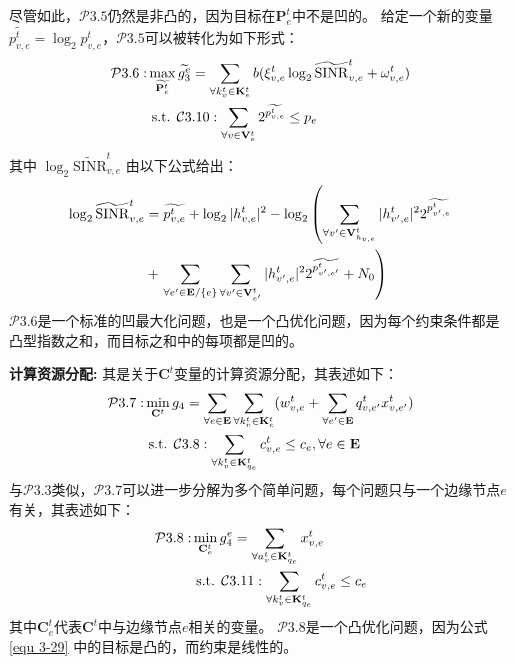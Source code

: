 尽管如此，$\mathcal{P}3.5$仍然是非凸的，因为目标在$\mathbf{P}_{e}^{t}$中不是凹的。
给定一个新的变量$\widetilde{p_{v, e}^t} = \log _{2} {p}_{v, e}^t$，$\mathcal{P}3.5$可以被转化为如下形式：
\begin{align}
	\mathcal{P}3.6: & \max_{\widetilde{\mathbf{{P}}_{e}^{t}}}  \widetilde{g_3^{e}}= \sum_{\forall k_{v}^{t} \in \mathbf{K}_{e}^{t}} {b ( \xi_{v, e}^{t} \log _{2}\mathrm{\widetilde{SINR}}_{v, e}^t + \omega_{v, e}^{t} ) } \notag \\
	&\text { s.t. } \mathcal{C}3.10: \sum_{\forall v \in \mathbf{V}_{e}^{t}} 2^{\widetilde{p_{v, e}^t}} \leq p_{e}  
\end{align}
其中 $\log _{2}\mathrm{\widetilde{SINR}}_{v, e}^t$ 由以下公式给出：
\begin{align}
	\log _{2}\mathrm{\widetilde{SINR}}_{v, e}^t &= \widetilde{p_{v, e}^t} + \log _{2} |h_{v, e}^t| ^{2} - \log _{2} \left( \sum\limits_{\forall v^{\prime} \in \mathbf{V}_{h_{v, e}}^{t}} |h_{v^{\prime}, e}^t|^2 2^{\widetilde{p_{v^{\prime}, e}^{t}}} \right. \notag \\
	&+ \left. \sum\limits_{\forall e^{\prime} \in \mathbf{E} / \{e\}} \sum\limits_{\forall v^{\prime} \in \mathbf{V}_{e^{\prime}}^{t}} |h_{v^{\prime}, e}^t|^2 2^{\widetilde{p_{v^{\prime}, e^{\prime}}^{t}}} + N_{0}\right)
\end{align}
\noindent $\mathcal{P}3.6$是一个标准的凹最大化问题，也是一个凸优化问题，因为每个约束条件都是凸型指数之和，而目标之和中的每项都是凹的。

\textbf{计算资源分配:} 其是关于$\mathbf{C}^{t}$变量的计算资源分配，其表述如下：
\begin{align}
	\mathcal{P}3.7: &\min_{\mathbf{C}^{t}} g_4= \sum_{ \forall e \in \mathbf{E}} \sum_{\forall k_{v}^{t} \in \mathbf{K}_{e}^{t}} ( w_{v, e}^{t} + \sum_{\forall e^{\prime} \in \mathbf{E}} q_{v, e^{\prime}}^{t} x_{v, e^{\prime}}^t) \notag \\
	&\text { s.t. } \mathcal{C}3.8:  \sum_{\forall k_{v}^{t} \in {\mathbf{K}_{q_e}^{t} }} c_{v, e}^t \leq c_{e}, \forall e \in \mathbf{E}
\end{align}
与$\mathcal{P}3.3$类似，$\mathcal{P}3.7$可以进一步分解为多个简单问题，每个问题只与一个边缘节点$e$有关，其表述如下：
\begin{align}
	\mathcal{P}3.8: &\min_{\mathbf{C}_{e}^{t}} g_4^e= \sum_{\forall a_{v}^{t} \in {\mathbf{K}_{q_e}^{t} }}   x_{v, e}^t \notag \\
	&\text { s.t. } \mathcal{C}3.11:  \sum_{\forall k_{v}^{t} \in {\mathbf{K}_{q_e}^{t} }} {c_{v, e}^t} \leq c_{e}
\label{equ 3-29}
\end{align}
\noindent 其中${\mathbf{C}_e^t}$代表${\mathbf{C}^{t}}$中与边缘节点$e$相关的变量。
$\mathcal{P}3.8$是一个凸优化问题，因为公式\ref{equ 3-29} 中的目标是凸的，而约束是线性的。

